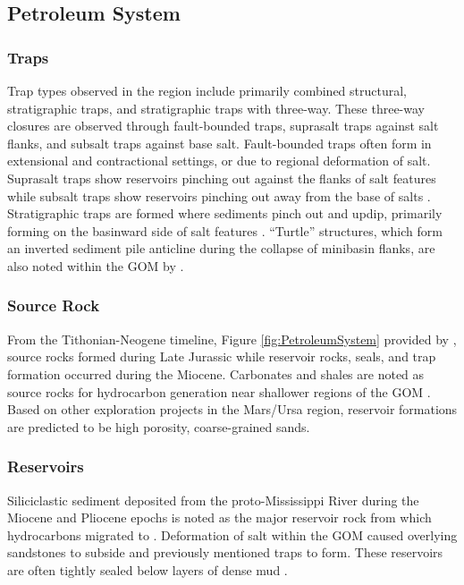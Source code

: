 \documentclass[fleqn]{article}
\begin{document}
\subsection{Petroleum System}
\subsubsection{Traps}
Trap types observed in the region include primarily combined structural, stratigraphic traps, and stratigraphic traps with three-way. These three-way closures are observed through fault-bounded traps, suprasalt traps against salt flanks, and subsalt traps against base salt. Fault-bounded traps often form in extensional and contractional settings, or due to regional deformation of salt. Suprasalt traps show reservoirs pinching out against the flanks of salt features while subsalt traps show reservoirs pinching out away from the base of salts \cite{Bouroullec}. Stratigraphic traps are formed where sediments pinch out and updip, primarily forming on the basinward side of salt features \cite{Bouroullec}. “Turtle” structures, which form an inverted sediment pile anticline during the collapse of minibasin flanks, are also noted within the GOM by \citeauthor{Bouroullec}. 

\subsubsection{Source Rock}
From the Tithonian-Neogene timeline, Figure \ref{fig:PetroleumSystem} provided by \citeauthor{Bouroullec}, source rocks formed during Late Jurassic while reservoir rocks, seals, and trap formation occurred during the Miocene. Carbonates and shales are noted as source rocks for hydrocarbon generation near shallower regions of the GOM \cite{Priest}. Based on other exploration projects in the Mars/Ursa region, reservoir formations are predicted to be high porosity, coarse-grained sands.

\subsubsection{Reservoirs}
Siliciclastic sediment deposited from the proto-Mississippi River during the Miocene and Pliocene epochs is noted as the major reservoir rock from which hydrocarbons migrated to \cite{Priest}. Deformation of salt within the GOM caused overlying sandstones to subside and previously mentioned traps to form. These reservoirs are often tightly sealed below layers of dense mud \cite{Priest}.
\end{document}
